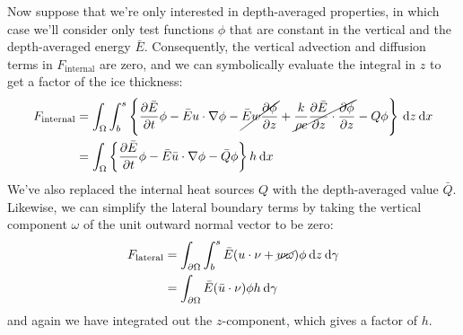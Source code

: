 \documentclass{article}
\theoremstyle{definition}
\theoremstyle{plain}
\newcommand{\ud}{\hspace{2pt}\mathrm{d}}
\begin{document}
Now suppose that we're only interested in depth-averaged properties, in which case we'll consider only test functions $\phi$ that are constant in the vertical and the depth-averaged energy $\bar E$.
Consequently, the vertical advection and diffusion terms in $F_{\text{internal}}$ are zero, and we can symbolically evaluate the integral in $z$ to get a factor of the ice thickness:
\begin{align}
    F_{\text{internal}} & = \int_\Omega\int_b^s\left\{\frac{\partial \bar E}{\partial t}\phi - \bar E u\cdot\nabla\phi - \cancel{\bar E w\frac{\partial\phi}{\partial z}} + \cancel{\frac{k}{\rho c}\frac{\partial \bar E}{\partial z}\cdot\frac{\partial\phi}{\partial z}} - Q\phi\right\}\ud z\ud x \nonumber\\
    & = \int_\Omega\left\{\frac{\partial \bar E}{\partial t}\phi - \bar E\bar u\cdot\nabla\phi - \bar Q\phi\right\}h\ud x
\end{align}
We've also replaced the internal heat sources $Q$ with the depth-averaged value $\bar Q$.
Likewise, we can simplify the lateral boundary terms by taking the vertical component $\omega$ of the unit outward normal vector to be zero:
\begin{align}
    F_{\text{lateral}} & = \int_{\partial\Omega}\int_b^s \bar E(u\cdot\nu + \cancel{w\omega})\phi \ud z\ud\gamma \nonumber\\
    & = \int_{\partial\Omega}\bar E(\bar u\cdot\nu)\phi h\ud\gamma
\end{align}
and again we have integrated out the $z$-component, which gives a factor of $h$.
\end{document}
